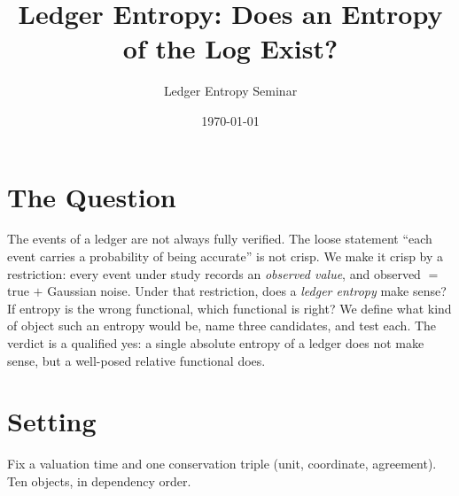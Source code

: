 \documentclass[11pt]{article}
\title{\vspace{-2em}Ledger Entropy: Does an Entropy of the Log Exist?}
\author{Ledger Entropy Seminar}
\date{\today}
\theoremstyle{definition}\newtheorem{definition}{Definition}
\theoremstyle{plain}\newtheorem{proposition}{Proposition}
\theoremstyle{remark}\newtheorem{remark}{Remark}
\begin{document}
\maketitle
\vspace{-2.2em}

\begin{center}\end{center}
\vspace{-0.4em}

\section{The Question}
The events of a ledger are not always fully verified. The loose statement ``each event
carries a probability of being accurate'' is not crisp. We make it crisp by a restriction:
every event under study records an \emph{observed value}, and observed $=$ true $+$ Gaussian
noise. Under that restriction, does a \emph{ledger entropy} make sense? If entropy is the
wrong functional, which functional is right? We define what kind of object such an entropy
would be, name three candidates, and test each. The verdict is a qualified yes: a single
absolute entropy of a ledger does not make sense, but a well-posed relative functional does.

\section{Setting}
Fix a valuation time and one conservation triple (unit, coordinate, agreement). Ten objects,
in dependency order.
\end{document}
